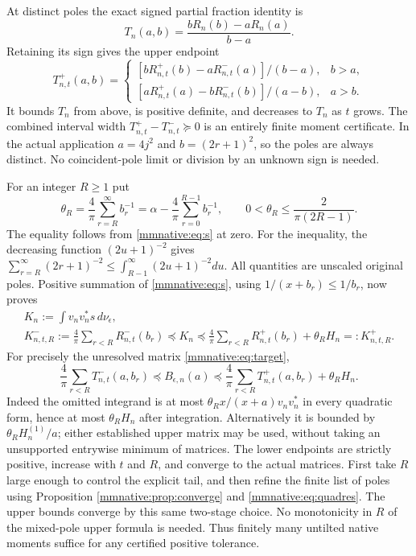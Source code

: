 At distinct poles the exact signed partial fraction identity is
\begin{equation}\label{mmnative:eq:partialfraction}
 T_n(a,b)=\frac{bR_n(b)-aR_n(a)}{b-a}.
\end{equation}
Retaining its sign gives the upper endpoint
\begin{equation}\label{mmnative:eq:quadraticupper}
 T_{n,t}^+(a,b)=
 \begin{cases}
 [bR_{n,t}^+(b)-aR_{n,t}^-(a)]/(b-a),&b>a,\\[1mm]
 [aR_{n,t}^+(a)-bR_{n,t}^-(b)]/(a-b),&a>b.
 \end{cases}
\end{equation}
It bounds $T_n$ from above, is positive definite, and decreases
to $T_n$ as $t$ grows.  The combined interval width
$T_{n,t}^+-T_{n,t}^-\succeq0$ is an entirely finite moment
certificate.  In the actual application $a=4j^2$ and
$b=(2r+1)^2$, so the poles are always distinct.  No coincident-pole
limit or division by an unknown sign is needed.

For an integer $R\ge1$ put
\begin{equation}\label{mmnative:eq:theta}
 \theta_R=\frac4\pi\sum_{r=R}^\infty b_r^{-1}
 =\alpha-\frac4\pi\sum_{r=0}^{R-1}b_r^{-1},\qquad
 0<\theta_R\le\frac{2}{\pi(2R-1)}.
\end{equation}
The equality follows from \eqref{mmnative:eq:s} at zero.  For the inequality,
the decreasing function $(2u+1)^{-2}$ gives
$\sum_{r=R}^\infty(2r+1)^{-2}\le\int_{R-1}^\infty(2u+1)^{-2}du$.
All quantities are unscaled original poles.  Positive summation of
\eqref{mmnative:eq:s}, using $1/(x+b_r)\le1/b_r$, now proves
\begin{equation}\label{mmnative:eq:tiltKbounds}
 \begin{gathered}
 K_n:=\int v_nv_n^*s\,d\nu_\epsilon,\\
 K_{n,t,R}^-:=\frac4\pi\sum_{r<R}R_{n,t}^-(b_r)
 \preceq K_n\preceq
 \frac4\pi\sum_{r<R}R_{n,t}^+(b_r)+\theta_RH_n
 =:K_{n,t,R}^+.
 \end{gathered}
\end{equation}
For precisely the unresolved matrix \eqref{mmnative:eq:target},
\begin{equation}\label{mmnative:eq:tiltBbounds}
 \boxed{\frac4\pi\sum_{r<R}T_{n,t}^-(a,b_r)
 \preceq B_{\epsilon,n}(a)\preceq
 \frac4\pi\sum_{r<R}T_{n,t}^+(a,b_r)+\theta_RH_n.}
\end{equation}
Indeed the omitted integrand is at most
$\theta_R x/(x+a)v_nv_n^*$ in every quadratic form, hence at most
$\theta_RH_n$ after integration.  Alternatively it is bounded by
$\theta_RH_n^{(1)}/a$; either established upper matrix may be used,
without taking an unsupported entrywise minimum of matrices.
The lower endpoints are strictly positive, increase with $t$ and $R$,
and converge to the actual matrices.  First take $R$ large enough to
control the explicit tail, and then refine the finite list of poles
using Proposition \ref{mmnative:prop:converge} and \eqref{mmnative:eq:quadres}.  The
upper bounds converge by this same two-stage choice.  No monotonicity
in $R$ of the mixed-pole upper formula is needed.  Thus finitely many
untilted native moments suffice for any certified positive tolerance.


